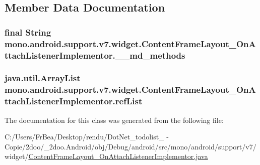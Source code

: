 \subsection{Member Data Documentation}
\hypertarget{classmono_1_1android_1_1support_1_1v7_1_1widget_1_1_content_frame_layout___on_attach_listener_implementor_db104bec4ab09495309f1f1f22b6fac4}{
\subsubsection[{\_\-\_\-md\_\-methods}]{\setlength{\rightskip}{0pt plus 5cm}final String {\bf mono.android.support.v7.widget.ContentFrameLayout\_\-OnAttachListenerImplementor.\_\-\_\-md\_\-methods}}}
\label{classmono_1_1android_1_1support_1_1v7_1_1widget_1_1_content_frame_layout___on_attach_listener_implementor_db104bec4ab09495309f1f1f22b6fac4}


\hypertarget{classmono_1_1android_1_1support_1_1v7_1_1widget_1_1_content_frame_layout___on_attach_listener_implementor_be7d68fdfca3650586c9ba6cf11c0cf8}{
\subsubsection[{refList}]{\setlength{\rightskip}{0pt plus 5cm}java.util.ArrayList {\bf mono.android.support.v7.widget.ContentFrameLayout\_\-OnAttachListenerImplementor.refList}}}
\label{classmono_1_1android_1_1support_1_1v7_1_1widget_1_1_content_frame_layout___on_attach_listener_implementor_be7d68fdfca3650586c9ba6cf11c0cf8}




The documentation for this class was generated from the following file:\begin{CompactItemize}
\item 
C:/Users/FrBea/Desktop/rendu/DotNet\_\-todolist\_ - Copie/2doo/\_\-2doo.Android/obj/Debug/android/src/mono/android/support/v7/widget/\hyperlink{_content_frame_layout___on_attach_listener_implementor_8java}{ContentFrameLayout\_\-OnAttachListenerImplementor.java}\end{CompactItemize}
